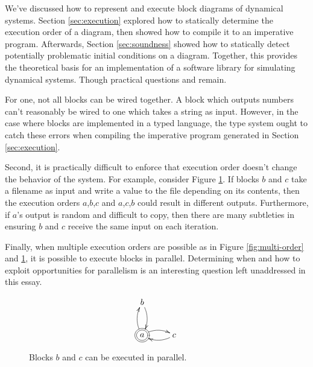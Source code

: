 \documentclass[twocolumn]{article}
\begin{document}
We've discussed how to represent and execute block diagrams of dynamical systems. Section \ref{sec:execution} explored how to statically determine the execution order of a diagram, then showed how to compile it to an imperative program. Afterwards, Section \ref{sec:soundness} showed how to statically detect potentially problematic initial conditions on a diagram. Together, this provides the theoretical basis for an implementation of a software library for simulating dynamical systems. Though practical questions and remain.

For one, not all blocks can be wired together. A block which outputs numbers can't reasonably be wired to one which takes a string as input. However, in the case where blocks are implemented in a typed language, the type system ought to catch these errors when compiling the imperative program generated in Section \ref{sec:execution}.

Second, it is practically difficult to enforce that execution order doesn't change the behavior of the system. For example, consider Figure \ref{fig:parallel}. If blocks $b$ and $c$ take a filename as input and write a value to the file depending on its contents, then the execution orders $a$,$b$,$c$ and $a$,$c$,$b$ could result in different outputs. Furthermore, if $a$'s output is random and difficult to copy, then there are many subtleties in ensuring $b$ and $c$ receive the same input on each iteration.

Finally, when multiple execution orders are possible as in Figure \ref{fig:multi-order} and \ref{fig:parallel}, it is possible to execute blocks in parallel. Determining when and how to exploit opportunities for parallelism is an interesting question left unaddressed in this essay.

\begin{figure}[h]
\[
\xymatrix{
b \\
*++[o][F=]{a} \ar@/^/[r] \ar@/_/@{<-}[r] \ar@/^/[u] \ar@/_/@{<-}[u] & c \\
}
\]
    \caption{Blocks $b$ and $c$ can be executed in parallel.}
    \label{fig:parallel}
\end{figure}

\printbibliography
\end{document}
